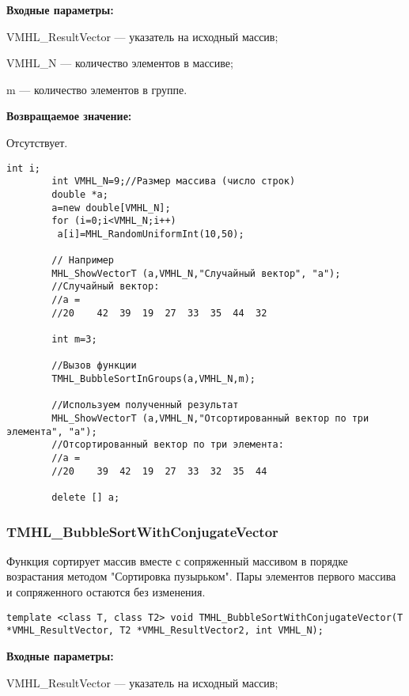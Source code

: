\documentclass[a4paper,12pt]{article}
\begin{document}
\textbf{Входные параметры:}
 
VMHL\_ResultVector --- указатель на исходный массив;
 
VMHL\_N --- количество элементов в массиве;
 
m --- количество элементов в группе.

\textbf{Возвращаемое значение:}

Отсутствует.


\begin{lstlisting}[label=code_use_TMHL_BubbleSortInGroups,caption=Пример использования]
        int i;
        int VMHL_N=9;//Размер массива (число строк)
        double *a;
        a=new double[VMHL_N];
        for (i=0;i<VMHL_N;i++)
         a[i]=MHL_RandomUniformInt(10,50);

        // Например
        MHL_ShowVectorT (a,VMHL_N,"Случайный вектор", "a");
        //Случайный вектор:
        //a =
        //20	42	39	19	27	33	35	44	32

        int m=3;

        //Вызов функции
        TMHL_BubbleSortInGroups(a,VMHL_N,m);

        //Используем полученный результат
        MHL_ShowVectorT (a,VMHL_N,"Отсортированный вектор по три элемента", "a");
        //Отсортированный вектор по три элемента:
        //a =
        //20	39	42	19	27	33	32	35	44

        delete [] a;
\end{lstlisting}

\subsubsection{TMHL\_BubbleSortWithConjugateVector}\label{TMHL_BubbleSortWithConjugateVector}

Функция сортирует массив вместе с сопряженный массивом в порядке возрастания методом "Сортировка пузырьком". Пары элементов первого массива и сопряженного остаются без изменения.


\begin{lstlisting}[label=code_syntax_TMHL_BubbleSortWithConjugateVector,caption=Синтаксис]
template <class T, class T2> void TMHL_BubbleSortWithConjugateVector(T *VMHL_ResultVector, T2 *VMHL_ResultVector2, int VMHL_N);
\end{lstlisting}

\textbf{Входные параметры:}
 
VMHL\_ResultVector --- указатель на исходный массив;
 
\end{document}
